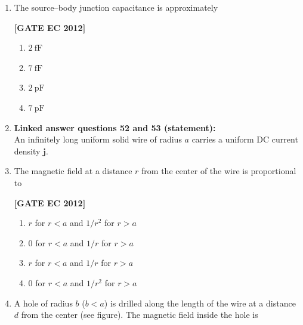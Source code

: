 \documentclass[12pt]{article}
\begin{document}
\begin{enumerate}[leftmargin=1.0em, label=\textbf{Q.\arabic*.}, itemsep=2em]
\begin{enumerate}[leftmargin=2.5em, label=\textbf{Q.\arabic*.}, itemsep=2em, start=46]
\item The source–body junction capacitance is approximately

\noindent \textbf{[GATE EC 2012]}
\begin{multicols}{2}
    \begin{enumerate}[label=\alph*.]
        \item $2\ \text{fF}$
        \item $7\ \text{fF}$
        \item $2\ \text{pF}$
        \item $7\ \text{pF}$
    \end{enumerate}
\end{multicols}

\item[] \textbf{Linked answer questions 52 and 53 (statement):}\\

An infinitely long uniform solid wire of radius $a$ carries a uniform DC current density $\mathbf{j}$.  

\item The magnetic field at a distance $r$ from the center of the wire is proportional to

\noindent \textbf{[GATE EC 2012]}
\begin{multicols}{2}
    \begin{enumerate}[label=\alph*.]
        \item $r$ for $r<a$ and $1/r^{2}$ for $r>a$
        \item $0$ for $r<a$ and $1/r$ for $r>a$
        \item $r$ for $r<a$ and $1/r$ for $r>a$
        \item $0$ for $r<a$ and $1/r^{2}$ for $r>a$
    \end{enumerate}
\end{multicols}

\item A hole of radius $b$ ($b<a$) is drilled along the length of the wire at a distance $d$ from the center (see figure). The magnetic field inside the hole is


\end{enumerate}
\end{enumerate}
\end{document}
